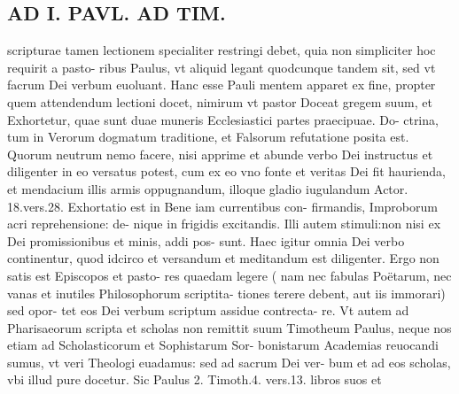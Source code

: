\documentclass{article}
\begin{document}
\begin{pages}
\section*{AD I. PAVL. AD TIM. }
\marginpar{[ p.432 ]}\pstart scripturae tamen lectionem specialiter restringi debet, quia non simpliciter hoc requirit a pasto- ribus Paulus, vt aliquid legant quodcunque tandem sit, sed vt facrum Dei verbum euoluant. Hanc esse Pauli mentem apparet ex fine, propter quem attendendum lectioni docet, nimirum vt pastor Doceat gregem suum, et Exhortetur, quae sunt duae muneris Ecclesiastici partes praecipuae. Do- ctrina, tum in Verorum dogmatum traditione, et Falsorum refutatione posita est. Quorum neutrum nemo facere, nisi apprime et abunde verbo Dei instructus et diligenter in eo versatus potest, cum ex eo vno fonte et veritas Dei fit haurienda, et mendacium illis armis oppugnandum, illoque gladio iugulandum Actor. 18.vers.28. Exhortatio est in Bene iam currentibus con- firmandis, Improborum acri reprehensione: de- nique in frigidis excitandis. Illi autem stimuli:non nisi ex Dei promissionibus et minis, addi pos- sunt. Haec igitur omnia Dei verbo continentur, quod idcirco et versandum et meditandum est diligenter. Ergo non satis est Episcopos et pasto- res quaedam legere ( nam nec fabulas Poëtarum, nec vanas et inutiles Philosophorum scriptita- tiones terere debent, aut iis immorari) sed opor- tet eos Dei verbum scriptum assidue contrecta- re. Vt autem ad Pharisaeorum scripta et scholas non remittit suum Timotheum Paulus, neque nos etiam ad Scholasticorum et Sophistarum Sor- bonistarum Academias reuocandi sumus, vt veri Theologi euadamus: sed ad sacrum Dei ver- bum et ad eos scholas, vbi illud pure docetur. Sic Paulus 2. Timoth.4. vers.13. libros suos et  \pend

\end{pages}
\end{document}
